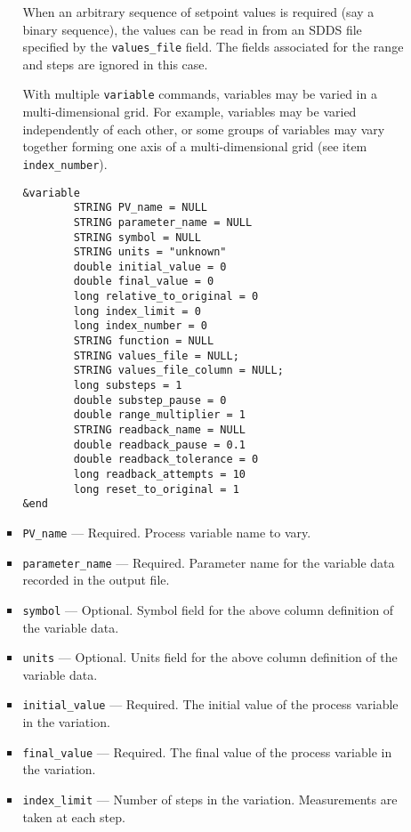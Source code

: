 \begin{itemize}
\begin{itemize}
\begin{itemize}
      When an arbitrary sequence of setpoint values is required (say a
      binary sequence), the values can be read in from an SDDS file
      specified by the {\verb+values_file+} field.  The fields
      associated for the range and steps are ignored in this case.

      With multiple \verb+variable+ commands, variables may be varied
      in a multi-dimensional grid.  For example, variables may be
      varied independently of each other, or some groups of variables
      may vary together forming one axis of a multi-dimensional grid
      (see item {\verb+index_number+}).

\begin{verbatim}
&variable
        STRING PV_name = NULL
        STRING parameter_name = NULL
        STRING symbol = NULL
        STRING units = "unknown"
        double initial_value = 0
        double final_value = 0
        long relative_to_original = 0
        long index_limit = 0
        long index_number = 0
        STRING function = NULL
        STRING values_file = NULL;
        STRING values_file_column = NULL;
        long substeps = 1
        double substep_pause = 0
        double range_multiplier = 1
        STRING readback_name = NULL
        double readback_pause = 0.1
        double readback_tolerance = 0
        long readback_attempts = 10
        long reset_to_original = 1
&end        
\end{verbatim}
   \item {\verb+PV_name+} --- Required. Process variable name to vary.

   \item {\verb+parameter_name+} --- Required. Parameter name for the
   variable data recorded in the output file.

   \item {\verb+symbol+} --- Optional. Symbol field for the above
   column definition of the variable data.

   \item {\verb+units+} --- Optional. Units field for the above column
   definition of the variable data.

   \item {\verb+initial_value+} --- Required. The initial value of the
   process variable in the variation.

   \item {\verb+final_value+} --- Required. The final value of the
   process variable in the variation.

   \item {\verb+index_limit+} --- Number of steps in the
   variation. Measurements are taken at each step.


\end{itemize}
\end{itemize}
\end{itemize}
